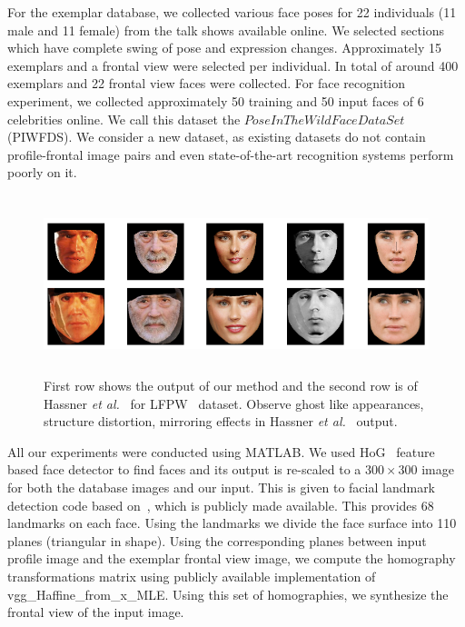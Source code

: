 For the exemplar database, we collected various face poses for 22 individuals (11 male and 11 female)
from the talk shows available online. We selected sections which have complete swing of pose and
expression changes. Approximately 15 exemplars and a frontal view were selected per individual.
In total of around 400 exemplars and 22 frontal view faces were collected. For face recognition
experiment, we collected approximately 50 training and 50 input faces of 6 celebrities online. We
call this dataset the $PoseInTheWildFaceDataSet$ (PIWFDS). We consider a new dataset, as existing
datasets do not contain profile-frontal image pairs and even state-of-the-art recognition systems
perform poorly on it.
 
 
\begin{figure}
\begin{center}\includegraphics[width =13cm,height=5.2cm]{front/figures/qualitative_result_1.png}\end{center}
\caption{First row shows the output of our method and the second row is of Hassner {\em et al.}~\cite{DBLP:journals/corr/HassnerHPE14} for LFPW~\cite{fiducials_cvpr2011} dataset. Observe ghost like appearances, structure distortion, mirroring effects in Hassner {\em et al.}~\cite{DBLP:journals/corr/HassnerHPE14} output.}
\label{fig:qualitative_result1}
\end{figure}


All our experiments were conducted using MATLAB. We used HoG~\cite{Dalal:2005:HOG:1068507.1069007} feature based face detector to find
faces and its output is re-scaled to a $300 \times 300$ image for both the
database images and our input. This is given to facial landmark detection code
based on~\cite{kazemi2014one}, which is publicly made available. This provides 68 landmarks on each face. Using
the landmarks we divide the face surface into 110 planes (triangular in shape). Using the
corresponding planes between input profile image and the exemplar frontal view image, we compute the
homography transformations matrix using publicly available implementation of
vgg\_Haffine\_from\_x\_MLE. Using this set of homographies, we synthesize the frontal view of the input image.
